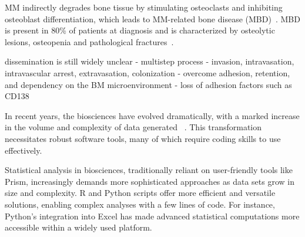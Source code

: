 MM indirectly degrades bone tissue by stimulating osteoclasts and inhibiting
osteoblast differentiation, which leads to MM-related bone disease
(MBD)~\cite{glaveyProteomicCharacterizationHuman2017}. MBD is present in 80\% of
patients at diagnosis and is characterized by osteolytic lesions, osteopenia and
pathological fractures~\cite{terposPathogenesisBoneDisease2018}.


dissemination is still widely unclear
- multistep process
- invasion, intravasation, intravascular arrest, extravasation,
colonization
- overcome adhesion, retention, and dependency on the BM
microenvironment
- loss of adhesion factors such as CD138

\newpage






In recent years, the biosciences have evolved dramatically, with a marked
increase in the volume and complexity of data generated
~\cite{yangScalabilityValidationBig2017,ekmekciIntroductionProgrammingBioscientists2016}.
This transformation necessitates robust software tools, many of which require
coding skills to use effectively.

Statistical analysis in biosciences, traditionally reliant on user-friendly
tools like Prism, increasingly demands more sophisticated approaches as data
sets grow in size and complexity. R and Python scripts offer more efficient and
versatile solutions, enabling complex analyses with a few lines of code. For
instance, Python's integration into Excel has made advanced statistical
computations more accessible within a widely used platform.

